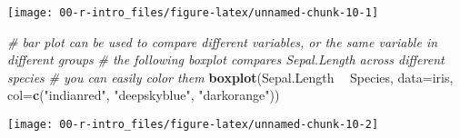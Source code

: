 \documentclass[
]{article}
\newenvironment{Shaded}{\begin{snugshade}}{\end{snugshade}}
\newcommand{\CommentTok}[1]{\textcolor[rgb]{0.56,0.35,0.01}{\textit{#1}}}
\newcommand{\DataTypeTok}[1]{\textcolor[rgb]{0.13,0.29,0.53}{#1}}
\newcommand{\DecValTok}[1]{\textcolor[rgb]{0.00,0.00,0.81}{#1}}
\newcommand{\KeywordTok}[1]{\textcolor[rgb]{0.13,0.29,0.53}{\textbf{#1}}}
\newcommand{\NormalTok}[1]{#1}
\newcommand{\OperatorTok}[1]{\textcolor[rgb]{0.81,0.36,0.00}{\textbf{#1}}}
\newcommand{\StringTok}[1]{\textcolor[rgb]{0.31,0.60,0.02}{#1}}
\begin{document}
\begin{center}\texttt{[image: 00-r-intro\_files/figure-latex/unnamed-chunk-10-1]} \end{center}

\begin{Shaded}
\begin{Highlighting}[]

    \CommentTok{# bar plot can be used to compare different variables, or the same variable in different groups}
    \CommentTok{# the following boxplot compares Sepal.Length across different species}
    \CommentTok{# you can easily color them}
    \KeywordTok{boxplot}\NormalTok{(Sepal.Length }\OperatorTok{~}\StringTok{ }\NormalTok{Species, }\DataTypeTok{data=}\NormalTok{iris, }\DataTypeTok{col=}\KeywordTok{c}\NormalTok{(}\StringTok{"indianred"}\NormalTok{, }\StringTok{"deepskyblue"}\NormalTok{, }\StringTok{"darkorange"}\NormalTok{))}
\end{Highlighting}
\end{Shaded}

\begin{center}\texttt{[image: 00-r-intro\_files/figure-latex/unnamed-chunk-10-2]} \end{center}

\begin{Shaded}
\end{Shaded}
\end{document}

